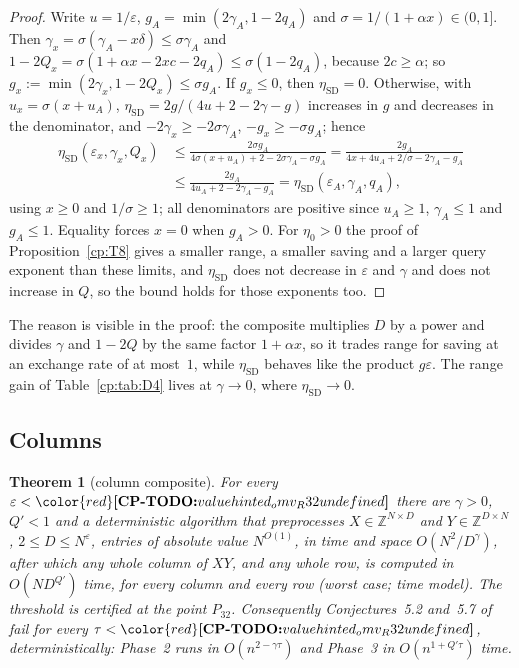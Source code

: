 \documentclass[11pt]{article}
\makeatletter
\newtheorem{theorem}{Theorem}[section]
\theoremstyle{definition}
\theoremstyle{remark}
\DeclareRobustCommand{\CPTODO}[1]{{\color{red}\textbf{[CP-TODO:} #1\textbf{]}}}
\providecommand{\eps}{\varepsilon}
\providecommand{\Z}{\mathbb{Z}}
\newcommand{\Pthree}{P_{32}}                  %
\newcommand{\Esd}{\eta_{\mathrm{SD}}}                 %
\newcommand{\cpv}[1]{\ifcsname cpv@#1\endcsname\csname cpv@#1\endcsname\else\CPTODO{value #1 undefined}\fi}
\makeatother
\begin{document}
\begin{proof}
Write $u=1/\eps$, $g_A=\min(2\gamma_A,1-2q_A)$ and $\sigma=1/(1+\alpha x)\in(0,1]$. Then $\gamma_x=\sigma(\gamma_A-x\delta)\le\sigma\gamma_A$ and $1-2Q_x=\sigma(1+\alpha x-2xc-2q_A)\le\sigma(1-2q_A)$, because $2c\ge\alpha$; so $g_x:=\min(2\gamma_x,1-2Q_x)\le\sigma g_A$. If $g_x\le0$, then $\Esd=0$. Otherwise, with $u_x=\sigma(x+u_A)$, $\Esd=2g/(4u+2-2\gamma-g)$ increases in $g$ and decreases in the denominator, and $-2\gamma_x\ge-2\sigma\gamma_A$, $-g_x\ge-\sigma g_A$; hence
\begin{align*}
\Esd(\eps_x,\gamma_x,Q_x)&\le\frac{2\sigma g_A}{4\sigma(x+u_A)+2-2\sigma\gamma_A-\sigma g_A}=\frac{2g_A}{4x+4u_A+2/\sigma-2\gamma_A-g_A}\\
&\le\frac{2g_A}{4u_A+2-2\gamma_A-g_A}=\Esd(\eps_A,\gamma_A,q_A),
\end{align*}
using $x\ge0$ and $1/\sigma\ge1$; all denominators are positive since $u_A\ge1$, $\gamma_A\le1$ and $g_A\le1$. Equality forces $x=0$ when $g_A>0$. For $\eta_0>0$ the proof of Proposition~\ref{cp:T8} gives a smaller range, a smaller saving and a larger query exponent than these limits, and $\Esd$ does not decrease in $\eps$ and $\gamma$ and does not increase in $Q$, so the bound holds for those exponents too.
\end{proof}

The reason is visible in the proof: the composite multiplies $D$ by a power and divides $\gamma$ and $1-2Q$ by the same factor $1+\alpha x$, so it trades range for saving at an exchange rate of at most~$1$, while $\Esd$ behaves like the product $g\eps$. The range gain of Table~\ref{cp:tab:D4} lives at $\gamma\to0$, where $\Esd\to0$.

\subsection{Columns}\label{cp:sec:D:columns}

\begin{theorem}[column composite]\label{cp:D5}
For every $\eps<\cpv{hinted_omv_R32}$ there are $\gamma>0$, $Q'<1$ and a deterministic algorithm that preprocesses $X\in\Z^{N\times D}$ and $Y\in\Z^{D\times N}$, $2\le D\le N^\eps$, entries of absolute value $N^{O(1)}$, in time and space $O(N^2/D^\gamma)$, after which any whole column of $XY$, and any whole row, is computed in $O(ND^{Q'})$ time, for every column and every row (worst case; time model). The threshold is certified at the point $\Pthree$. Consequently Conjectures~5.2 and~5.7 of~\cite{BNS19} fail for every $\tau<\cpv{hinted_omv_R32}$, deterministically: Phase~2 runs in $O(n^{2-\gamma\tau})$ and Phase~3 in $O(n^{1+Q'\tau})$ time.
\end{theorem}
\end{document}
